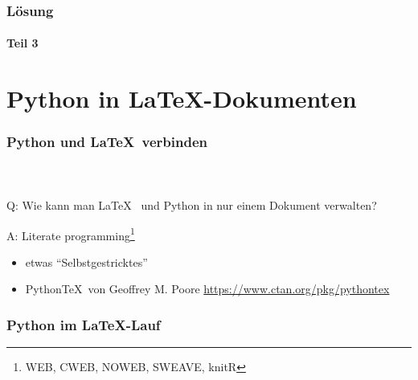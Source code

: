 \documentclass[12pt,ngerman]{beamer}
\newcounter{Aufgabe}
\begin{document}
\begin{frame}[fragile]
\frametitle{Lösung}
\framesubtitle{Teil 3}

 

\end{frame}





\section{Python in \LaTeX-Dokumenten}

\begin{frame}
\frametitle{Python und \LaTeX\ verbinden}
\framesubtitle{~}

Q: Wie kann man \LaTeX~ und Python in nur einem Dokument verwalten?

A: Literate programming\footnote{WEB, CWEB, NOWEB, SWEAVE, knitR}

\begin{itemize}
\item etwas \enquote{Selbstgestricktes}
\item Python\TeX\ von Ge­of­frey M. Poore \url{https://www.ctan.org/pkg/pythontex}
\end{itemize}
\end{frame}

\begin{frame}
\frametitle{Python im \LaTeX-Lauf}

\begin{center}
\end{center}

\end{frame}
\end{document}
